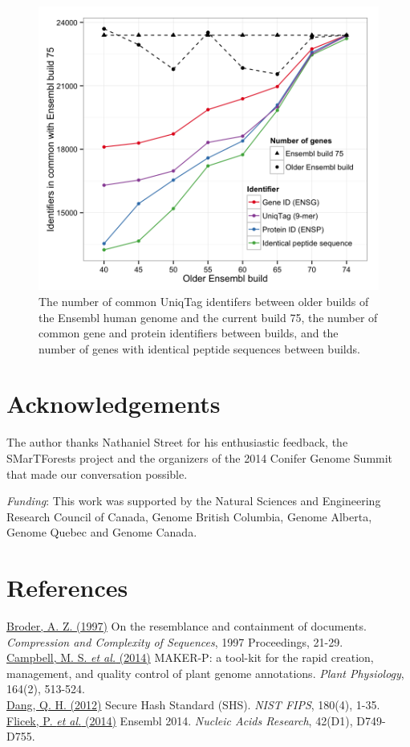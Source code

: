 \documentclass{bioinfo}
\begin{document}
\begin{figure}[htbp]
\centering
\includegraphics{ensembl.png}
\caption{The number of common UniqTag identifers between older builds of
the Ensembl human genome and the current build 75, the number of common
gene and protein identifiers between builds, and the number of genes
with identical peptide sequences between builds.}
\end{figure}

\section*{Acknowledgements}\label{acknowledgements}

The author thanks Nathaniel Street for his enthusiastic feedback, the
SMarTForests project and the organizers of the 2014 Conifer Genome
Summit that made our conversation possible.

\emph{Funding}: This work was supported by the Natural Sciences and
Engineering Research Council of Canada, Genome British Columbia, Genome
Alberta, Genome Quebec and Genome Canada.

\section*{References}\label{references}

\href{http://dx.doi.org/10.1109/SEQUEN.1997.666900}{Broder, A. Z.
(1997)} On the resemblance and containment of documents.
\emph{Compression and Complexity of Sequences}, 1997 Proceedings,
21-29.\\\href{http://dx.doi.org/10.1104/pp.113.230144}{Campbell, M. S.
\emph{et al.} (2014)} MAKER-P: a tool-kit for the rapid creation,
management, and quality control of plant genome annotations. \emph{Plant
Physiology}, 164(2),
513-524.\\\href{http://www.nist.gov/manuscript-publication-search.cfm?pub_id=910977}{Dang,
Q. H. (2012)} Secure Hash Standard (SHS). \emph{NIST FIPS}, 180(4),
1-35.\\\href{http://dx.doi.org/10.1093/nar/gkt1196}{Flicek, P. \emph{et
al.} (2014)} Ensembl 2014. \emph{Nucleic Acids Research}, 42(D1),
D749-D755.
\end{document}

